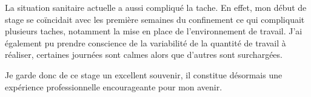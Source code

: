 \par La situation sanitaire actuelle a aussi compliqué la tache. En effet, mon début de stage se coïncidait avec les première semaines du confinement ce qui compliquait plusieurs taches, notamment la mise en place de l'environnement de travail. J’ai également pu prendre conscience de la variabilité de la quantité de travail à réaliser, certaines journées sont calmes alors que d’autres sont surchargées.
\par Je garde donc de ce stage un excellent souvenir, il constitue désormais une expérience professionnelle encourageante pour mon avenir.